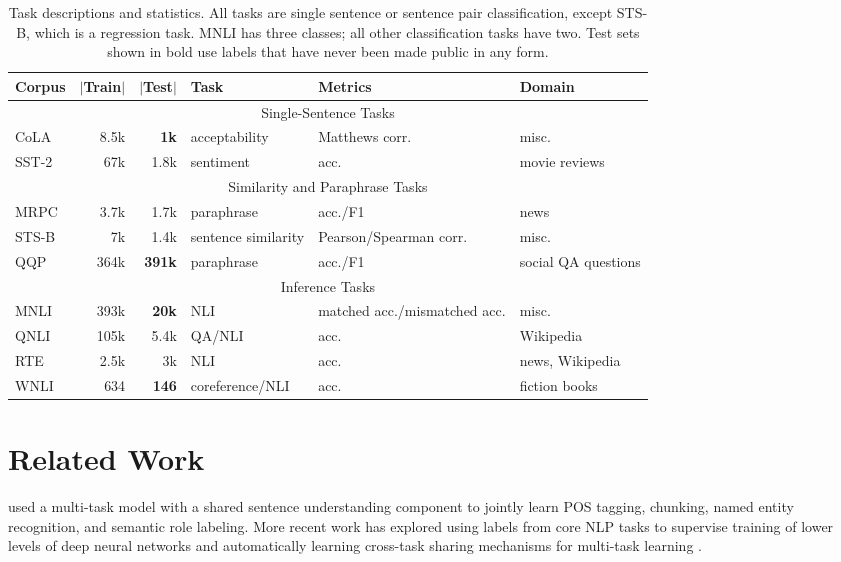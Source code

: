 \begin{table*}[t]
\centering \small
\begin{tabular}{lrrlll}
 \toprule
\textbf{Corpus} & \textbf{$|$Train$|$} & \textbf{$|$Test$|$} & \textbf{Task} & \textbf{Metrics} & \textbf{Domain} \\
\midrule
\multicolumn{6}{c}{Single-Sentence Tasks}\\
\midrule
CoLA & 8.5k & \textbf{1k} & acceptability & Matthews corr.& misc. \\ %
SST-2 & 67k & 1.8k & sentiment & acc. & movie reviews \\
\midrule
\multicolumn{6}{c}{Similarity and Paraphrase Tasks}\\
\midrule
MRPC & 3.7k & 1.7k & paraphrase & acc./F1 & news \\
STS-B & 7k & 1.4k & sentence similarity & Pearson/Spearman corr. & misc. \\
QQP & 364k & \textbf{391k} & paraphrase & acc./F1 & social QA questions \\
\midrule
\multicolumn{6}{c}{Inference Tasks} \\
\midrule
MNLI & 393k & \textbf{20k} & NLI & matched acc./mismatched acc. & misc. \\
QNLI & 105k & 5.4k & QA/NLI & acc. & Wikipedia \\
RTE & 2.5k & 3k & NLI & acc. & news, Wikipedia \\
WNLI & 634 & \textbf{146} & coreference/NLI & acc. & fiction books \\
\bottomrule
\end{tabular}
\caption{Task descriptions and statistics. All tasks are single sentence or sentence pair classification, except STS-B, which is a regression task. MNLI has three classes; all other classification tasks have two. Test sets shown in bold use labels that have never been made public in any form.
}
\label{tab:tasks}
\end{table*}

\section{Related Work}
\label{sec:related}
\citet{collobert2011natural} used a multi-task model with a shared sentence understanding component to jointly learn POS tagging, chunking, named entity recognition, and semantic role labeling.
More recent work has explored using labels from core NLP tasks to supervise training of lower levels of deep neural networks \citep{sogaard2016deep,hashimoto2016joint} and 
automatically learning cross-task sharing mechanisms for multi-task learning \citep{ruder2017sluice}.

